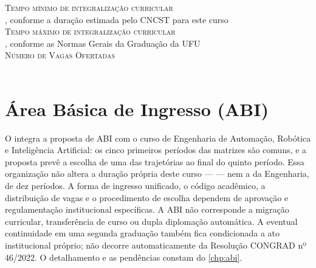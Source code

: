 \begin{center}
\parbox{0.8\textwidth}{
    \textsc{\small \textcolor{AzulClaro}{Tempo mínimo de integralização curricular}} \\ \hspace*{15mm} \textbf{\ppctempominimo}, conforme a duração estimada pelo CNCST para este curso~\cite{mec_cncst_2024}\\
    \textsc{\small \textcolor{AzulClaro}{Tempo máximo de integralização curricular}} \\ \hspace*{15mm} \textbf{\ppctempomaximo}, conforme as Normas Gerais da Graduação da UFU~\cite{ufu_congrad_46_2022}\\
    \textsc{\small \textcolor{AzulClaro}{Número de Vagas Ofertadas}} \\ \hspace*{15mm} \textbf{\ppcvagasofertadas}\\
}
\end{center}

\section*{Área Básica de Ingresso (ABI)}

O \ppccurso integra a proposta de ABI com o curso de Engenharia de Automação, Robótica e Inteligência Artificial: os cinco primeiros períodos das matrizes são comuns, e a proposta prevê a escolha de uma das trajetórias ao final do quinto período. Essa organização não altera a duração própria deste curso — \textbf{\ppctempominimo} — nem a da Engenharia, de dez períodos. A forma de ingresso unificado, o código acadêmico, a distribuição de vagas e o procedimento de escolha dependem de aprovação e regulamentação institucional específicas. A ABI não corresponde a migração curricular, transferência de curso ou dupla diplomação automática. A eventual continuidade em uma segunda graduação também fica condicionada a ato institucional próprio; não decorre automaticamente da Resolução CONGRAD nº 46/2022. O detalhamento e as pendências constam do \autoref{chp:abi}.

